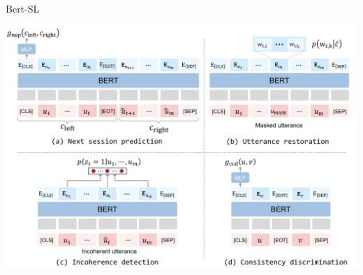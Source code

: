 \documentclass{beamer}
\begin{document}
\begin{frame}{Bert-SL}
            \begin{center}
            \includegraphics[width=0.9\linewidth]{Bert-SL.png}
        \end{center}
\end{frame}
\end{document}
